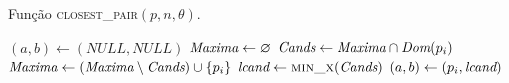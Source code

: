 \begin{algorithm}
    \caption{Função \textsc{closest\_pair}$(p, n, \theta)$.}
    \label{parestatico:horizontal}
\begin{algorithmic}[1]
        \State $(a,b) \leftarrow (NULL, NULL)$
        \State {} 
        \State $\textit{Maxima} \leftarrow \varnothing$
            \State $\textit{Cands} \leftarrow \textit{Maxima}\cap \textit{Dom}(p_i)$
            \State $\textit{Maxima} \leftarrow (\textit{Maxima} \setminus \textit{Cands}) \cup \left\{ p_i\right\}$
            \State $\lcand \leftarrow \Call{min\_x}{\Cands}$
                \State $(a, b) \leftarrow (p_i, \textit{lcand})$
            \EndIf
        \EndFor
        \State {}
    \EndFunction
\end{algorithmic}
\end{algorithm}